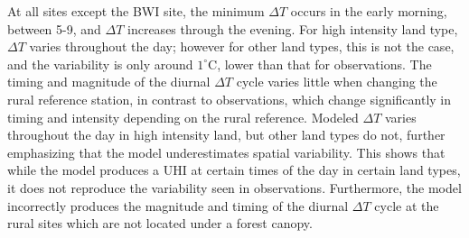 \documentclass[draft,linenumbers]{agujournal}
\begin{document}
At all sites except the BWI site, the minimum $\Delta T$ occurs in the early morning, between 5-9, and $\Delta T$ increases through the evening. 
For high intensity land type, $\Delta T$ varies throughout the day; however for other land types, this is not the case, and the variability is only around $1^\circ$C, lower than that for observations.  
The timing and magnitude of the diurnal $\Delta T$ cycle varies little when changing the rural reference station, in contrast to observations, which change significantly in timing and intensity depending on the rural reference. 
Modeled $\Delta T$ varies throughout the day in high intensity land, but other land types do not, further emphasizing that the model underestimates spatial variability.  
This shows that while the model produces a UHI at certain times of the day in certain land types, it does not reproduce the variability seen in observations.
Furthermore, the model incorrectly produces the magnitude and timing of the diurnal $\Delta T$ cycle at the rural sites which are not located under a forest canopy.  %
\end{document}
